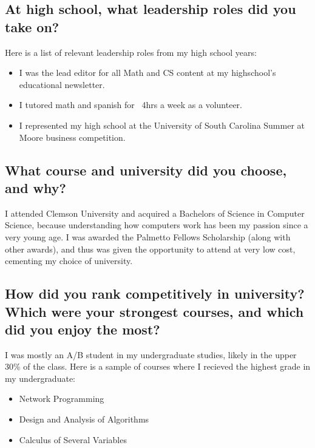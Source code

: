 \documentclass{article}
\begin{document}
\subsection{At high school, what leadership roles did you take on?}

Here is a list of relevant leadership roles from my high school years:
\begin{itemize}
    \item I was the lead editor for all Math and CS content at my highschool's educational newsletter.
    \item I tutored math and spanish for ~4hrs a week as a volunteer.
    \item I represented my high school at the University of South Carolina Summer at Moore business competition.
\end{itemize}
\subsection{What course and university did you choose, and why?}

I attended Clemson University and acquired a Bachelors of Science in Computer
Science, because understanding how computers work has been my passion since a
very young age. I was awarded the Palmetto Fellows Scholarship (along with other
awards), and thus was given the opportunity to attend at very low cost, cementing
my choice of university.

\subsection{How did you rank competitively in university? Which were your
    strongest courses, and which did you enjoy the most?}

I was mostly an A/B student in my undergraduate studies, likely in the upper
30\% of the class. Here is a sample of courses where I recieved the highest
grade in my undergraduate:
\begin{itemize}
    \item Network Programming
    \item Design and Analysis of Algorithms
    \item Calculus of Several Variables
\end{itemize}
\end{document}
